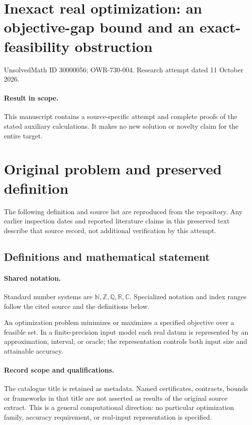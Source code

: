 \documentclass[11pt]{article}
\begin{document}
\section*{Inexact real optimization: an objective-gap bound and an exact-feasibility obstruction}
\noindent UnsolvedMath ID 30000056; OWR-730-004. Research attempt dated 11 October 2026.
\paragraph{Result in scope.}This manuscript contains a source-specific attempt and complete proofs of the stated auxiliary calculations. It makes no new solution or novelty claim for the entire target.
\section{Original problem and preserved definition}
The following definition and source list are reproduced from the repository. Any earlier inspection dates and reported literature claims in this preserved text describe that source record, not additional verification by this attempt.
\subsection{Definitions and mathematical statement}

\paragraph{Shared notation.}Standard number systems are $\mathbb N,\mathbb Z,\mathbb Q,\mathbb R,\mathbb C$. Specialized notation and index ranges follow the cited source and the definitions below.


An optimization problem minimizes or maximizes a specified objective over a feasible set. In a finite-precision input model each real datum is represented by an approximation, interval, or oracle; the representation controls both input size and attainable accuracy.
\paragraph{Record scope and qualifications.}
The catalogue title is retained as metadata. Named certificates, contracts, bounds or frameworks in that title are not asserted as results of the original source extract.
This is a general computational direction: no particular optimization family, accuracy requirement, or real-input representation is specified.
\end{document}
